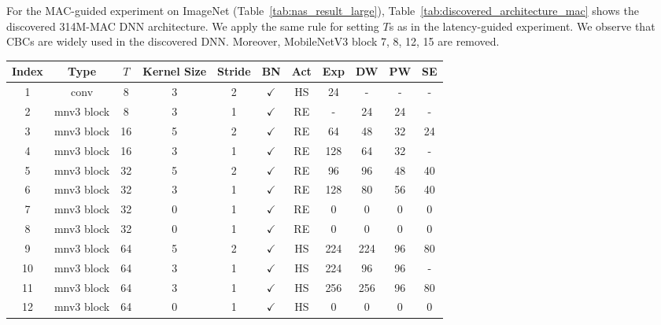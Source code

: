 For the MAC-guided experiment on ImageNet (Table~\ref{tab:nas_result_large}), Table~\ref{tab:discovered_architecture_mac} shows the discovered 314M-MAC DNN architecture. We apply the same rule for setting $T$s as in the latency-guided experiment. We observe that CBCs are widely used in the discovered DNN. Moreover, MobileNetV3 block 7, 8, 12, 15 are removed.


\begin{table*}[t]
\centering
\begin{tabular}{c|c|c|c|c|c|c|c|c|c|c}
\toprule
Index & Type            & $T$    & Kernel Size & Stride & BN      & Act & Exp  & DW   & PW   & SE  \\ \toprule
1     & conv            & 8    & 3                                                     & 2      & $\checkmark$ & HS  & 24   & -    & -    & -   \\ \hline
2     & mnv3 block      & 8    & 3                                                     & 1      & $\checkmark$ & RE  & -    & 24    & 24   & -   \\ \hline

3     & mnv3 block      & 16   & 5                                                     & 2      & $\checkmark$ & RE  & 64   & 48   & 32   & 24  \\ \hline
4     & mnv3 block      & 16   & 3                                                     & 1      & $\checkmark$ & RE  & 128  & 64   & 32   & -   \\ \hline

5     & mnv3 block      & 32   & 5                                                     & 2      & $\checkmark$ & RE  & 96   & 96   & 48   & 40  \\ \hline
6     & mnv3 block      & 32   & 3                                                     & 1      & $\checkmark$ & RE  & 128 & 80   & 56   & 40  \\ \hline
7     & mnv3 block      & 32   & 0                                                     & 1      & $\checkmark$ & RE  & 0  & 0   & 0   & 0  \\ \hline
8     & mnv3 block      & 32   & 0                                                     & 1      & $\checkmark$ & RE  & 0   & 0   & 0   & 0  \\ \hline

9     & mnv3 block      & 64   & 5                                                     & 2      & $\checkmark$ & HS  & 224  & 224  & 96  & 80  \\ \hline
10    & mnv3 block      & 64   & 3                                                     & 1      & $\checkmark$ & HS  & 224  & 96  & 96  & -   \\ \hline
11    & mnv3 block      & 64   & 3                                                     & 1      & $\checkmark$ & HS  & 256  & 256   & 96   & 80  \\ \hline
12    & mnv3 block      & 64   & 0                                                     & 1      & $\checkmark$ & HS  & 0    & 0    & 0    & 0   \\ \hline


\end{tabular}
\end{table*}
